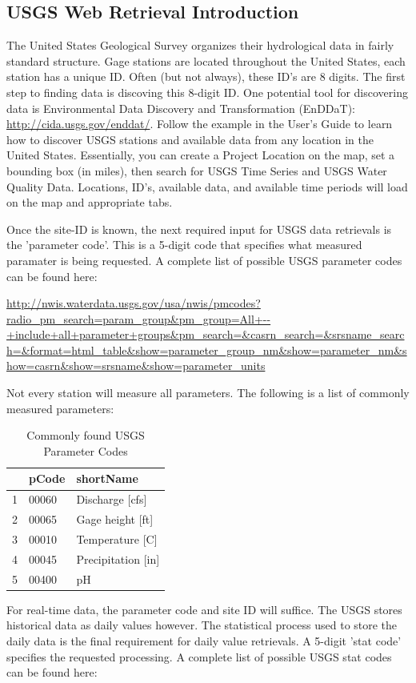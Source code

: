 \documentclass[a4paper,11pt]{article}
\begin{document}
\subsection{USGS Web Retrieval Introduction}
The United States Geological Survey organizes their hydrological data in fairly standard structure.  Gage stations are located throughout the United States, each station has a unique ID.  Often (but not always), these ID's are 8 digits.  The first step to finding data is discoving this 8-digit ID. One potential tool for discovering data is Environmental Data Discovery and Transformation (EnDDaT): \url{http://cida.usgs.gov/enddat/}.  Follow the example in the User's Guide to learn how to discover USGS stations and available data from any location in the United States. Essentially, you can create a Project Location on the map, set a bounding box (in miles), then search for USGS Time Series and USGS Water Quality Data. Locations, ID's, available data, and available time periods will load on the map and appropriate tabs.

Once the site-ID is known, the next required input for USGS data retrievals is the 'parameter code'.  This is a 5-digit code that specifies what measured paramater is being requested.  A complete list of possible USGS parameter codes can be found here: 

\url{http://nwis.waterdata.usgs.gov/usa/nwis/pmcodes?radio_pm_search=param_group&pm_group=All+--+include+all+parameter+groups&pm_search=&casrn_search=&srsname_search=&format=html_table&show=parameter_group_nm&show=parameter_nm&show=casrn&show=srsname&show=parameter_units}

Not every station will measure all parameters. The following is a list of commonly measured parameters:

\begin{table}[ht]
\begin{center}
\caption{Commonly found USGS Parameter Codes}
\begin{tabular}{rll}
  \hline
 & pCode & shortName \\ 
  \hline
1 & 00060 & Discharge [cfs] \\ 
  2 & 00065 & Gage height [ft] \\ 
  3 & 00010 & Temperature [C] \\ 
  4 & 00045 & Precipitation [in] \\ 
  5 & 00400 & pH \\ 
   \hline
\end{tabular}
\end{center}
\end{table}
For real-time data, the parameter code and site ID will suffice.  The USGS stores historical data as daily values however.  The statistical process used to store the daily data is the final requirement for daily value retrievals.  A 5-digit 'stat code' specifies the requested processing.  A complete list of possible USGS stat codes can be found here:
\end{document}
